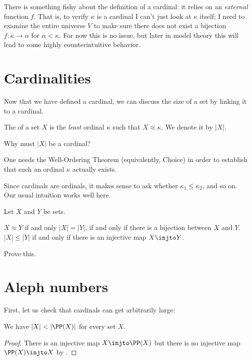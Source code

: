 \begin{remark}
	There is something fishy about the definition of a cardinal:
	it relies on an \emph{external} function $f$.
	That is, to verify $\kappa$ is a cardinal I can't just look at $\kappa$ itself;
	I need to examine the entire universe $V$ to make sure
	there does not exist a bijection $f : \kappa \to \alpha$ for $\alpha < \kappa$.
	For now this is no issue, but later in model theory
	this will lead to some highly counterintuitive behavior.
\end{remark}

\section{Cardinalities}
Now that we have defined a cardinal, we can discuss the size
of a set by linking it to a cardinal.

\begin{definition}
	The  of a set $X$
	is the \emph{least} ordinal $\kappa$ such that $X \approx \kappa$.
	We denote it by $\left\lvert X \right\rvert$.
\end{definition}
\begin{ques}
	Why must $\left\lvert X \right\rvert$ be a cardinal?
\end{ques}
\begin{remark}
	One needs the Well-Ordering Theorem (equivalently, Choice)
	in order to establish that such an ordinal $\kappa$ actually exists.
\end{remark}
Since cardinals are ordinals, it makes sense to ask whether $\kappa_1 \le \kappa_2$,
and so on.
Our usual intuition works well here.
\begin{proposition}
	Let $X$ and $Y$ be sets.
	\begin{enumerate}[(i)]
		\ii $X \approx Y$ if and only $\left\lvert X \right\rvert = \left\lvert Y \right\rvert$,
		if and only if there is a bijection between $X$ and $Y$.
		\ii $\left\lvert X \right\rvert \le \left\lvert Y \right\rvert$
		if and only if there is an injective map $X \injto Y$.
	\end{enumerate}
\end{proposition}
\begin{ques}
	Prove this.
\end{ques}

\section{Aleph numbers}
First, let us check that cardinals can get arbitrarily large:
\begin{proposition}
	We have $\left\lvert X \right\rvert < \left\lvert \PP(X) \right\rvert$ for every set $X$.
\end{proposition}
\begin{proof}
	There is an injective map $X \injto \PP(X)$
	but there is no injective map $\PP(X) \injto X$ by .
\end{proof}

